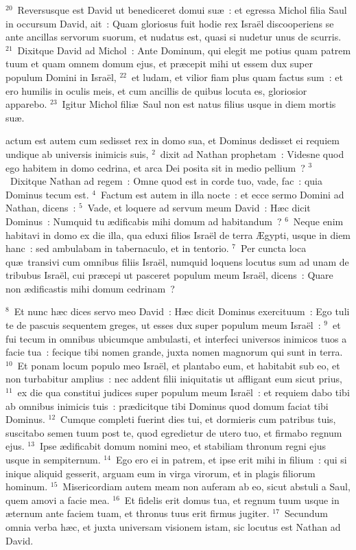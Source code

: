 ${}^{20}$~Reversusque est David ut benediceret domui su\ae~: et egressa Michol filia Saul in occursum David, ait~: Quam gloriosus fuit hodie rex Isra\"el discooperiens se ante ancillas servorum suorum, et nudatus est, quasi si nudetur unus de scurris.
${}^{21}$~Dixitque David ad Michol~: Ante Dominum, qui elegit me potius quam patrem tuum et quam omnem domum ejus, et pr\ae cepit mihi ut essem dux super populum Domini in Isra\"el,
${}^{22}$~et ludam, et vilior fiam plus quam factus sum~: et ero humilis in oculis meis, et cum ancillis de quibus locuta es, gloriosior apparebo.
${}^{23}$~Igitur Michol fili\ae\ Saul non est natus filius usque in diem mortis su\ae .

\bchapter
{}actum est autem cum sedisset rex in domo sua, et Dominus dedisset ei requiem undique ab universis inimicis suis,
${}^{2}$~dixit ad Nathan prophetam~: Videsne quod ego habitem in domo cedrina, et arca Dei posita sit in medio pellium~?
${}^{3}$~Dixitque Nathan ad regem~: Omne quod est in corde tuo, vade, fac~: quia Dominus tecum est.
${}^{4}$~Factum est autem in illa nocte~: et ecce sermo Domini ad Nathan, dicens~:
${}^{5}$~Vade, et loquere ad servum meum David~: H\ae c dicit Dominus~: Numquid tu \ae dificabis mihi domum ad habitandum~?
${}^{6}$~Neque enim habitavi in domo ex die illa, qua eduxi filios Isra\"el de terra \AE gypti, usque in diem hanc~: sed ambulabam in tabernaculo, et in tentorio.
${}^{7}$~Per cuncta loca qu\ae\ transivi cum omnibus filiis Isra\"el, numquid loquens locutus sum ad unam de tribubus Isra\"el, cui pr\ae cepi ut pasceret populum meum Isra\"el, dicens~: Quare non \ae dificastis mihi domum cedrinam~?


${}^{8}$~Et nunc h\ae c dices servo meo David~: H\ae c dicit Dominus exercituum~: Ego tuli te de pascuis sequentem greges, ut esses dux super populum meum Isra\"el~:
${}^{9}$~et fui tecum in omnibus ubicumque ambulasti, et interfeci universos inimicos tuos a facie tua~: fecique tibi nomen grande, juxta nomen magnorum qui sunt in terra.
${}^{10}$~Et ponam locum populo meo Isra\"el, et plantabo eum, et habitabit sub eo, et non turbabitur amplius~: nec addent filii iniquitatis ut affligant eum sicut prius,
${}^{11}$~ex die qua constitui judices super populum meum Isra\"el~: et requiem dabo tibi ab omnibus inimicis tuis~: pr\ae dicitque tibi Dominus quod domum faciat tibi Dominus.
${}^{12}$~Cumque completi fuerint dies tui, et dormieris cum patribus tuis, suscitabo semen tuum post te, quod egredietur de utero tuo, et firmabo regnum ejus.
${}^{13}$~Ipse \ae dificabit domum nomini meo, et stabiliam thronum regni ejus usque in sempiternum.
${}^{14}$~Ego ero ei in patrem, et ipse erit mihi in filium~: qui si inique aliquid gesserit, arguam eum in virga virorum, et in plagis filiorum hominum.
${}^{15}$~Misericordiam autem meam non auferam ab eo, sicut abstuli a Saul, quem amovi a facie mea.
${}^{16}$~Et fidelis erit domus tua, et regnum tuum usque in \ae ternum ante faciem tuam, et thronus tuus erit firmus jugiter.
${}^{17}$~Secundum omnia verba h\ae c, et juxta universam visionem istam, sic locutus est Nathan ad David.


